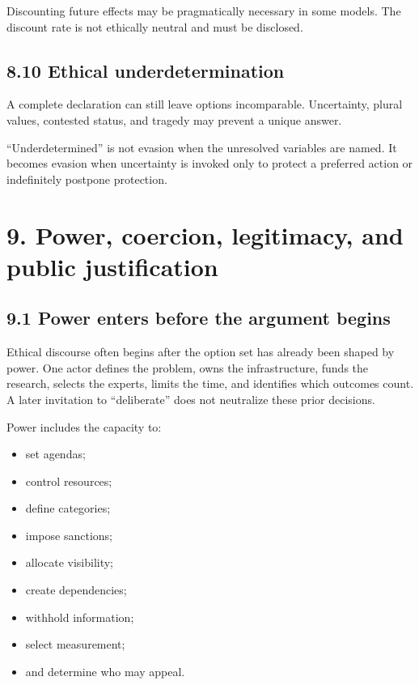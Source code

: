 \documentclass[
  11pt,
]{article}
\providecommand{\tightlist}{%
  \setlength{\itemsep}{0pt}\setlength{\parskip}{0pt}}
\begin{document}
Discounting future effects may be pragmatically necessary in some
models. The discount rate is not ethically neutral and must be
disclosed.

\subsection{8.10 Ethical
underdetermination}\label{ethical-underdetermination}

A complete declaration can still leave options incomparable.
Uncertainty, plural values, contested status, and tragedy may prevent a
unique answer.

``Underdetermined'' is not evasion when the unresolved variables are
named. It becomes evasion when uncertainty is invoked only to protect a
preferred action or indefinitely postpone protection.

\section{9. Power, coercion, legitimacy, and public
justification}\label{power-coercion-legitimacy-and-public-justification}

\subsection{9.1 Power enters before the argument
begins}\label{power-enters-before-the-argument-begins}

Ethical discourse often begins after the option set has already been
shaped by power. One actor defines the problem, owns the infrastructure,
funds the research, selects the experts, limits the time, and identifies
which outcomes count. A later invitation to ``deliberate'' does not
neutralize these prior decisions.

Power includes the capacity to:

\begin{itemize}
\tightlist
\item
  set agendas;
\item
  control resources;
\item
  define categories;
\item
  impose sanctions;
\item
  allocate visibility;
\item
  create dependencies;
\item
  withhold information;
\item
  select measurement;
\item
  and determine who may appeal.
\end{itemize}
\end{document}
